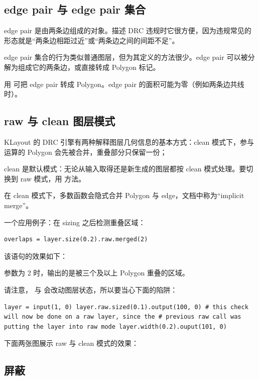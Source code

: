 \subsection{edge pair 与 edge pair 集合}

edge pair 是由两条边组成的对象。描述 DRC 违规时它很方便，因为违规常见的形态就是“两条边相距过近”或“两条边之间的间距不足”。

edge pair 集合的行为类似普通图层，但为其定义的方法很少。edge pair 可以被分解为组成它的两条边，或直接转成 Polygon 标记。

用  可把 edge pair 转成 Polygon。edge pair 的面积可能为零（例如两条边共线时）。

\subsection{raw 与 clean 图层模式}

KLayout 的 DRC 引擎有两种解释图层几何信息的基本方式：clean 模式下，参与运算的 Polygon 会先被合并，重叠部分只保留一份；

clean 是默认模式：无论从输入取得还是新生成的图层都按 clean 模式处理。要切换到 raw 模式，用  方法。

在 clean 模式下，多数函数会隐式合并 Polygon 与 edge，文档中称为“implicit merge”。

一个应用例子：在 sizing 之后检测重叠区域：

\begin{lstlisting}
overlaps = layer.size(0.2).raw.merged(2)
\end{lstlisting}

该语句的效果如下：


 参数为 2 时，输出的是被三个及以上 Polygon 重叠的区域。

请注意， 与  会改动图层状态，所以要当心下面的陷阱：

\begin{lstlisting}
layer = input(1, 0) layer.raw.sized(0.1).output(100, 0) # this check will now be done on a raw layer, since the # previous raw call was putting the layer into raw mode layer.width(0.2).ouput(101, 0)
\end{lstlisting}

下面两张图展示 raw 与 clean 模式的效果：

\subsection{屏蔽}

